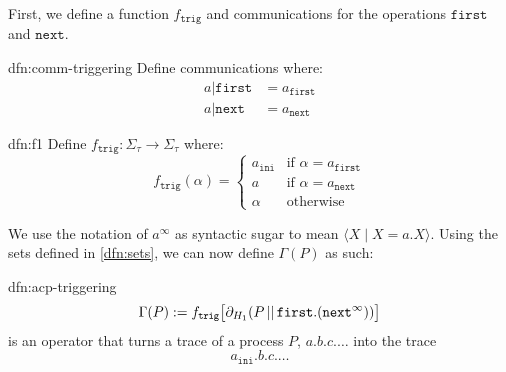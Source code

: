 \documentclass[../hons_project.tex]{subfiles}
\begin{document}
First, we define a function $f_{\mathtt{trig}}$ and communications for the operations $\mathtt{first}$ and $\mathtt{next}$.


\begin{multicols}{2}
\begin{dfn-s}[Communications]{dfn:comm-triggering}{}
Define communications where:
\begin{align*}
	a | \mathtt{first} & = a_{\mathtt{first}} \\
	a | \mathtt{next}  & = a_{\mathtt{next}}
\end{align*}
\end{dfn-s}


\begin{dfn-s}{dfn:f1}{}
Define $f_{\mathtt{trig}}: \Sigma_{\tau} \to \Sigma_{\tau}$ where:
\[
	f_{\mathtt{trig}}(\alpha) = \begin{cases}
		a_{\mathtt{ini}} & \text{if } \alpha = a_{\mathtt{first}} \\
		a                & \text{if } \alpha = a_{\mathtt{next}}  \\
		\alpha           & \text{otherwise}
	\end{cases}
\]
\end{dfn-s}
\end{multicols}

We use the notation of $a^{\infty}$ as syntactic sugar to mean $\langle X \mid X = a.X \rangle$. Using the sets defined in \ref{dfn:sets}, we can now define $\Gamma(P)$ as such:

\begin{dfn}{dfn:acp-triggering}{}
	\[\Gamma(P) := f_{\mathtt{trig}}\bigl[\partial_{H_{1}}(P \merge \mathtt{first}.(\mathtt{next}^{\infty}))\bigr]\]
	is an operator that turns a trace of a process $P$, $a.b.c.\dots$ into the trace
	\[a_{\mathtt{ini}}. b. c. \dots\]
\end{dfn}
\end{document}
